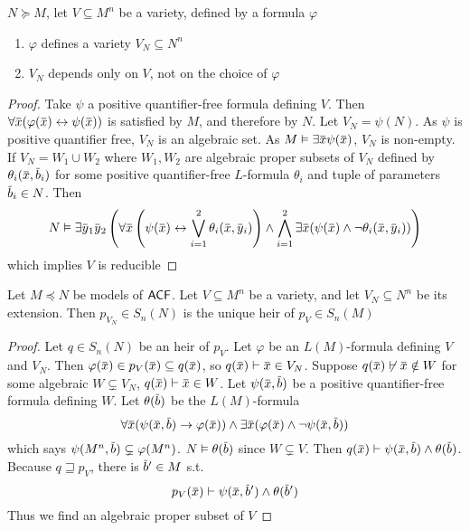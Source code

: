 \documentclass[11pt]{article}
\begin{document}
\begin{proposition}[]
\(N\succeq M\), let \(V\subseteq M^n\) be a variety, defined by a formula \(\varphi\)
\begin{enumerate}
\item \(\varphi\) defines a variety \(V_N\subseteq N^n\)
\item \(V_N\) depends only on \(V\), not on the choice of \(\varphi\)
\end{enumerate}
\end{proposition}

\begin{proof}
Take \(\psi\) a positive quantifier-free formula defining \(V\). Then \(\forall\barx(\varphi(\barx)\leftrightarrow\psi(\barx))\) is
satisfied by \(M\), and therefore by \(N\). Let \(V_N=\psi(N)\). As \(\psi\) is positive quantifier
free, \(V_N\) is an algebraic set. As \(M\vDash\exists\barx\psi(\barx)\), \(V_N\) is non-empty.
If \(V_N=W_1\cup W_2\) where \(W_1,W_2\) are algebraic proper subsets of \(V_N\) defined
by \(\theta_i(\barx,\barb_i)\) for some positive quantifier-free \(L\)-formula \(\theta_i\) and tuple of
parameters \(\barb_i\in N\). Then
\begin{equation*}
N\vDash\exists\bary_1\bary_2\left( \forall\barx
\left( \psi(\barx)\leftrightarrow\bigvee_{i=1}^2\theta_i(\barx,\bary_i) \right)\wedge
\bigwedge_{i=1}^2\exists\barx(\psi(\barx)\wedge\neg\theta_i(\barx,\bary_i)) \right)
\end{equation*}
which implies \(V\)  is reducible
\end{proof}

\begin{theorem}[]
Let \(M\preceq N\) be models of \(\textsf{ACF}\). Let \(V\subseteq M^n\) be a variety, and let \(V_N\subseteq N^n\) be its
extension. Then \(p_{V_N}\in S_n(N)\) is the unique heir of \(p_V\in S_n(M)\)
\end{theorem}

\begin{proof}
Let \(q\in S_n(N)\) be an heir of \(p_V\). Let \(\varphi\) be an \(L(M)\)-formula defining \(V\)
and \(V_N\). Then \(\varphi(\barx)\in p_V(\barx)\subseteq q(\barx)\), so \(q(\barx)\vdash\barx\in V_N\).
Suppose \(q(\barx)\not\vdash\barx\notin W\) for some algebraic \(W\subsetneq V_N\), \(q(\barx)\vdash\barx\in W\).
Let \(\psi(\barx,\barb)\) be a positive quantifier-free formula defining \(W\). Let \(\theta(\barb)\) be
the \(L(M)\)-formula
\begin{equation*}
\forall\barx(\psi(\barx,\barb)\to\varphi(\barx))\wedge\exists\barx(\varphi(\barx)\wedge\neg\psi(\barx,\barb))
\end{equation*}
which says \(\psi(M^n,\barb)\subsetneq\varphi(M^n)\). \(N\vDash\theta(\barb)\) since \(W\subsetneq V\).
Then \(q(\barx)\vdash\psi(\barx,\barb)\wedge\theta(\barb)\). Because \(q\sqsupseteq p_V\), there is \(\barb'\in M\) s.t.
\begin{equation*}
p_V(\barx)\vdash\psi(\barx,\barb')\wedge\theta(\barb')
\end{equation*}
Thus we find an algebraic proper subset of \(V\)
\end{proof}
\end{document}
